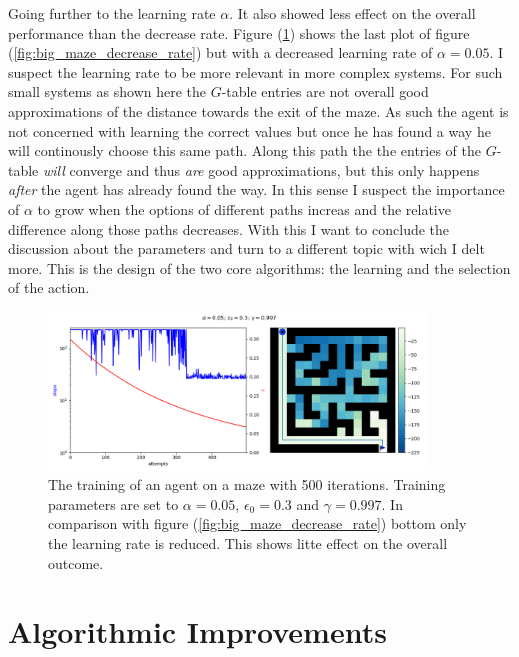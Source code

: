 \documentclass[12pt,a4paper]{scrartcl}
\begin{document}
Going further to the learning rate $\alpha$. It also showed less effect on the
overall performance than the decrease rate. Figure 
(\ref{fig:big_maze_learning_rate}) shows the last plot of figure
(\ref{fig:big_maze_decrease_rate}) but with a decreased learning rate
of $\alpha = 0.05$. I suspect the learning rate to be more relevant in more
complex systems. For such small systems as shown here the $G$-table entries are
not overall good approximations of the distance towards the exit of the maze.
As such the agent is not concerned with learning the correct values but once he
has found a way he will continously choose this same path. Along this path the
the entries of the $G$-table \textit{will} converge and thus \textit{are}
good approximations, but this only happens \textit{after} the agent has already
found the way. In this sense I suspect the importance of $\alpha$ to grow when
the options of different paths increas and the relative difference along those
paths decreases. With this I want to conclude the discussion about the
parameters and turn to a different topic with wich I delt more.
This is the design of the two core algorithms: the learning and the selection
of the action.

\begin{figure}[htbp]
    \centering
    \includegraphics[width=0.9\textwidth]{parameters/big_mazeN500_lr0.05_er0.30_dr0.99700.png}
    \caption{
        The training of an agent on a maze with 500 iterations.
        Training parameters are set to $\alpha = 0.05$, $\epsilon_0 = 0.3$ and
        $\gamma = 0.997$. In comparison with figure
        (\ref{fig:big_maze_decrease_rate}) bottom only the learning rate is
        reduced. This shows litte effect on the overall outcome.
    }
    \label{fig:big_maze_learning_rate}
\end{figure}

\FloatBarrier
\section{Algorithmic Improvements}
\label{seq:improvements}
\end{document}
